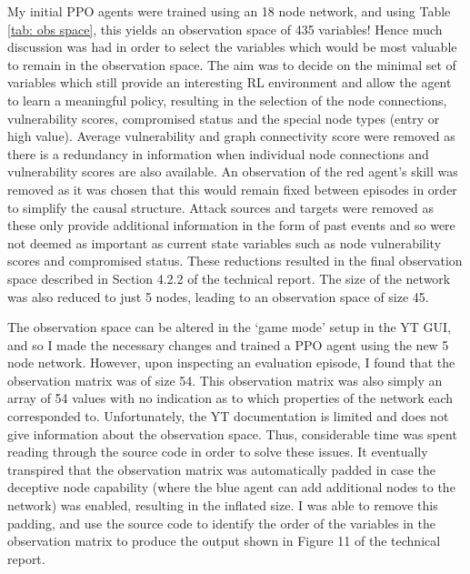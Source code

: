 \documentclass{article}
\begin{document}
My initial PPO agents were trained using an 18 node network, and using Table \ref{tab: obs space}, this yields an observation space of 435 variables! Hence much discussion was had in order to select the variables which would be most valuable to remain in the observation space. The aim was to decide on the minimal set of variables which still provide an interesting RL environment and allow the agent to learn a meaningful policy, resulting in the selection of the node connections, vulnerability scores, compromised status and the special node types (entry or high value). Average vulnerability and graph connectivity score were removed as there is a redundancy in information when individual node connections and vulnerability scores are also available. An observation of the red agent's skill was removed as it was chosen that this would remain fixed between episodes in order to simplify the causal structure. Attack sources and targets were removed as these only provide additional information in the form of past events and so were not deemed as important as current state variables such as node vulnerability scores and compromised status. These reductions resulted in the final observation space described in Section 4.2.2 of the technical report. The size of the network was also reduced to just 5 nodes, leading to an observation space of size 45.

The observation space can be altered in the `game mode' setup in the YT GUI, and so I made the necessary changes and trained a PPO agent using the new 5 node network. However, upon inspecting an evaluation episode, I found that the observation matrix was of size 54. This observation matrix was also simply an array of 54 values with no indication as to which properties of the network each corresponded to. Unfortunately, the YT documentation is limited and does not give information about the observation space. Thus, considerable time was spent reading through the source code in order to solve these issues. It eventually transpired that the observation matrix was automatically padded in case the deceptive node capability (where the blue agent can add additional nodes to the network) was enabled, resulting in the inflated size. I was able to remove this padding, and use the source code to identify the order of the variables in the observation matrix to produce the output shown in Figure 11 of the technical report. 
\end{document}
